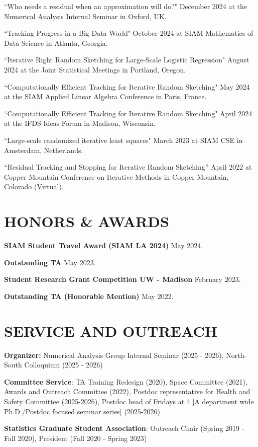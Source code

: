 \documentclass[margin,11pt]{res}
\begin{document}
\begin{resume}
``Who needs a residual when an approximation will do?"  December 2024 at the Numerical Analysis Internal Seminar in Oxford, UK.

``Tracking Progress in a Big Data World" October 2024 at SIAM Mathematics of Data Science in Atlanta, Georgia.

``Iterative Right Random Sketching for Large-Scale Logistic Regression" August 2024 at the Joint Statistical Meetings in Portland, Oregon.

``Computationally Efficient Tracking for Iterative Random Sketching" May 2024 at the SIAM Applied Linear Algebra Conference in Paris, France.

``Computationally Efficient Tracking for Iterative Random Sketching" April 2024 at the IFDS Ideas Forum in Madison, Wisconsin.

``Large-scale randomized iterative least squares" March 2023 at SIAM CSE in Amsterdam, Netherlands.

``Residual Tracking and Stopping for Iterative Random Sketching'' April 2022 at Copper Mountain Conference on Iterative Methods in Copper Mountain, Colorado (Virtual). 

\section{HONORS \& AWARDS} 
{\bf SIAM Student Travel Award (SIAM LA 2024)} \hfill May 2024.

{\bf Outstanding TA} \hfill May 2023.

{\bf Student Research Grant Competition UW - Madison} \hfill February 2023.

{\bf Outstanding TA (Honorable Mention)} \hfill May 2022.




\section{SERVICE AND OUTREACH}

\textbf{Organizer:} Numerical Analysis Group Internal Seminar (2025 - 2026), North-South Colloquium (2025 - 2026) 

\textbf{Committee Service}: TA Training Redesign (2020), Space Committee (2021), Awards and Outreach Committee (2022), Postdoc representative for Health and Safety Committee (2025-2026), Postdoc head of Fridays at 4 [A department wide Ph.D./Postdoc focused seminar series] (2025-2026)

\textbf{Statistics Graduate Student Association}: Outreach Chair (Spring 2019 - Fall 2020), President (Fall 2020 - Spring 2023)



\end{resume}
\end{document}
